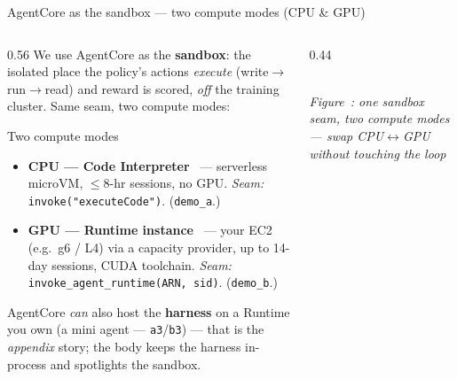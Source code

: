 \documentclass[aspectratio=169]{beamer}
\newcounter{deckfig}
\newcommand{\figtag}[1]{\refstepcounter{deckfig}%
  {\scriptsize\itshape Figure~\thedeckfig: #1}}
\begin{document}
\begin{frame}{AgentCore as the sandbox --- two compute modes (CPU \& GPU)}
  \begin{columns}[T]
    \begin{column}{0.56\textwidth}
      \footnotesize We use AgentCore as the \textbf{sandbox}: the isolated place the policy's
      actions \emph{execute} (write$\to$run$\to$read) and reward is scored, \emph{off} the
      training cluster. Same seam, two compute modes:
      \vspace{0.3em}
      \begin{block}{Two compute modes}
        \begin{itemize}\setlength\itemsep{0.15em}
          \item \textbf{CPU --- Code Interpreter}~\cite{ac-codeinterp} --- serverless microVM,
            $\le$8-hr sessions, no GPU. \emph{Seam:} \texttt{invoke("executeCode")}. (\texttt{demo\_a}.)
          \item \textbf{GPU --- Runtime instance}~\cite{ac-runtime} --- your EC2 (e.g.\ g6 / L4)
            via a capacity provider, up to 14-day sessions, CUDA toolchain. \emph{Seam:}
            \texttt{invoke\_agent\_runtime(ARN, sid)}. (\texttt{demo\_b}.)
        \end{itemize}
      \end{block}
      \vspace{0.2em}
      {\scriptsize AgentCore \emph{can} also host the \textbf{harness} on a Runtime you own (a mini
      agent --- \texttt{a3}/\texttt{b3}) --- that is the \emph{appendix} story; the body keeps the
      harness in-process and spotlights the sandbox.}
    \end{column}
    \begin{column}{0.44\textwidth}
      \centering
      \\[0.25em]\figtag{one sandbox seam, two compute modes --- swap CPU$\leftrightarrow$GPU without touching the loop}
    \end{column}
  \end{columns}
\end{frame}
\end{document}
